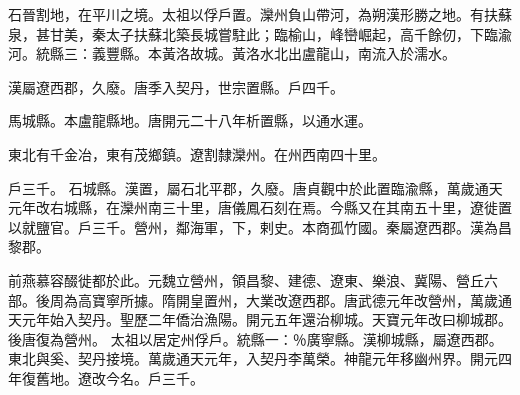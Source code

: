 \begin{pinyinscope}
 石晉割地，在平川之境。太祖以俘戶置。灤州負山帶河，為朔漢形勝之地。有扶蘇泉，甚甘美，秦太子扶蘇北築長城嘗駐此；臨榆山，峰巒崛起，高千餘仞，下臨渝河。統縣三：義豐縣。本黃洛故城。黃洛水北出盧龍山，南流入於濡水。



 漢屬遼西郡，久廢。唐季入契丹，世宗置縣。戶四千。



 馬城縣。本盧龍縣地。唐開元二十八年析置縣，以通水運。



 東北有千金冶，東有茂鄉鎮。遼割隸灤州。在州西南四十里。



 戶三千。
 石城縣。漢置，屬石北平郡，久廢。唐貞觀中於此置臨渝縣，萬歲通天元年改右城縣，在灤州南三十里，唐儀鳳石刻在焉。今縣又在其南五十里，遼徙置以就鹽官。戶三千。營州，鄰海軍，下，剌史。本商孤竹國。秦屬遼西郡。漢為昌黎郡。



 前燕慕容醊徙都於此。元魏立營州，領昌黎、建德、遼東、樂浪、冀陽、營丘六部。後周為高寶寧所據。隋開皇置州，大業改遼西郡。唐武德元年改營州，萬歲通天元年始入契丹。聖歷二年僑治漁陽。開元五年還治柳城。天寶元年改曰柳城郡。後唐復為營州。
 太祖以居定州俘戶。統縣一：％廣寧縣。漢柳城縣，屬遼西郡。東北與奚、契丹接境。萬歲通天元年，入契丹李萬榮。神龍元年移幽州界。開元四年復舊地。遼改今名。戶三千。



\end{pinyinscope}
